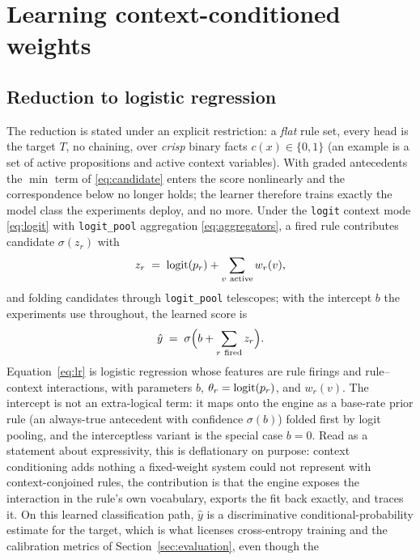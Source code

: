 \section{Learning context-conditioned weights}\label{sec:learning}

\subsection{Reduction to logistic regression}

The reduction is stated under an explicit restriction: a \emph{flat}
rule set, every head is the target $T$, no chaining, over
\emph{crisp} binary facts $c(x)\in\{0,1\}$ (an example is a set of
active propositions and active context variables). With graded
antecedents the $\min$ term of \eqref{eq:candidate} enters the score
nonlinearly and the correspondence below no longer holds; the learner
therefore trains exactly the model class the experiments deploy, and no
more. Under the
\texttt{logit} context mode \eqref{eq:logit} with \texttt{logit\_pool}
aggregation \eqref{eq:aggregators}, a fired rule contributes candidate
$\sigma(z_r)$ with
\begin{equation}
z_r \;=\; \logit(p_r) + \sum_{v\ \text{active}} w_r(v),
\end{equation}
and folding candidates through \texttt{logit\_pool} telescopes; with
the intercept $b$ the experiments use throughout, the learned score
is
\begin{equation}
\hat{y} \;=\; \sigma\Bigl(b + \sum_{r\ \text{fired}} z_r\Bigr).
\label{eq:lr}
\end{equation}
Equation~\eqref{eq:lr} is logistic regression whose features are rule
firings and rule--context interactions, with parameters $b$,
$\theta_r = \operatorname{logit}(p_r)$, and $w_r(v)$. The intercept is not an
extra-logical term: it maps onto the engine as a base-rate prior rule
(an always-true antecedent with confidence $\sigma(b)$) folded first
by logit pooling, and the interceptless variant is the special case
$b = 0$. Read as a statement about
expressivity, this is deflationary on purpose: context conditioning
adds nothing a fixed-weight system could not represent with
context-conjoined rules, the contribution is that the engine
exposes the interaction in the rule's own vocabulary, exports the fit
back exactly, and traces it. On this learned classification path,
$\hat{y}$ is a discriminative conditional-probability estimate for the
target, which is what licenses cross-entropy training and the
calibration metrics of Section~\ref{sec:evaluation}, even though the
